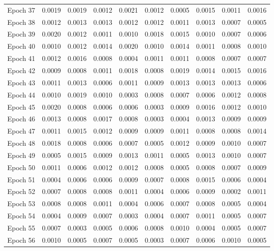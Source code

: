 \begin{table}[htbp]
\begin{tabular}{|l|l|l|l|l|l|l|l|l|l|}
Epoch 37 & 0.0019 & 0.0019 & 0.0012 & 0.0021 & 0.0012 & 0.0005 & 0.0015 & 0.0011 & 0.0016  \\
Epoch 38 & 0.0012 & 0.0013 & 0.0013 & 0.0012 & 0.0012 & 0.0011 & 0.0013 & 0.0007 & 0.0005  \\
Epoch 39 & 0.0020 & 0.0012 & 0.0011 & 0.0010 & 0.0018 & 0.0015 & 0.0010 & 0.0007 & 0.0006  \\
Epoch 40 & 0.0010 & 0.0012 & 0.0014 & 0.0020 & 0.0010 & 0.0014 & 0.0011 & 0.0008 & 0.0010  \\
Epoch 41 & 0.0012 & 0.0016 & 0.0008 & 0.0004 & 0.0011 & 0.0011 & 0.0008 & 0.0007 & 0.0007  \\
Epoch 42 & 0.0009 & 0.0008 & 0.0011 & 0.0018 & 0.0008 & 0.0019 & 0.0014 & 0.0015 & 0.0016  \\
Epoch 43 & 0.0011 & 0.0013 & 0.0006 & 0.0011 & 0.0009 & 0.0013 & 0.0013 & 0.0013 & 0.0006  \\
Epoch 44 & 0.0010 & 0.0019 & 0.0010 & 0.0003 & 0.0008 & 0.0007 & 0.0006 & 0.0012 & 0.0008  \\
Epoch 45 & 0.0020 & 0.0008 & 0.0006 & 0.0006 & 0.0003 & 0.0009 & 0.0016 & 0.0012 & 0.0010  \\
Epoch 46 & 0.0013 & 0.0008 & 0.0017 & 0.0008 & 0.0003 & 0.0004 & 0.0013 & 0.0009 & 0.0009  \\
Epoch 47 & 0.0011 & 0.0015 & 0.0012 & 0.0009 & 0.0009 & 0.0011 & 0.0008 & 0.0008 & 0.0014  \\
Epoch 48 & 0.0018 & 0.0008 & 0.0006 & 0.0007 & 0.0005 & 0.0012 & 0.0009 & 0.0010 & 0.0007  \\
Epoch 49 & 0.0005 & 0.0015 & 0.0009 & 0.0013 & 0.0011 & 0.0005 & 0.0013 & 0.0010 & 0.0007  \\
Epoch 50 & 0.0011 & 0.0006 & 0.0012 & 0.0012 & 0.0008 & 0.0005 & 0.0008 & 0.0007 & 0.0009  \\
Epoch 51 & 0.0004 & 0.0006 & 0.0006 & 0.0009 & 0.0007 & 0.0008 & 0.0015 & 0.0006 & 0.0004  \\
Epoch 52 & 0.0007 & 0.0008 & 0.0008 & 0.0011 & 0.0004 & 0.0006 & 0.0009 & 0.0002 & 0.0011  \\
Epoch 53 & 0.0008 & 0.0008 & 0.0011 & 0.0004 & 0.0006 & 0.0007 & 0.0008 & 0.0005 & 0.0004  \\
Epoch 54 & 0.0004 & 0.0009 & 0.0007 & 0.0003 & 0.0004 & 0.0007 & 0.0011 & 0.0005 & 0.0007  \\
Epoch 55 & 0.0007 & 0.0003 & 0.0005 & 0.0006 & 0.0008 & 0.0010 & 0.0004 & 0.0005 & 0.0007  \\
Epoch 56 & 0.0010 & 0.0005 & 0.0007 & 0.0005 & 0.0003 & 0.0007 & 0.0006 & 0.0010 & 0.0005  \\

\end{tabular}
\end{table}

